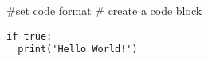 \usepackage{minted}
#set code format
# create a code block
\begin{verbatim}
if true:
  print('Hello World!')
\end{verbatim}
